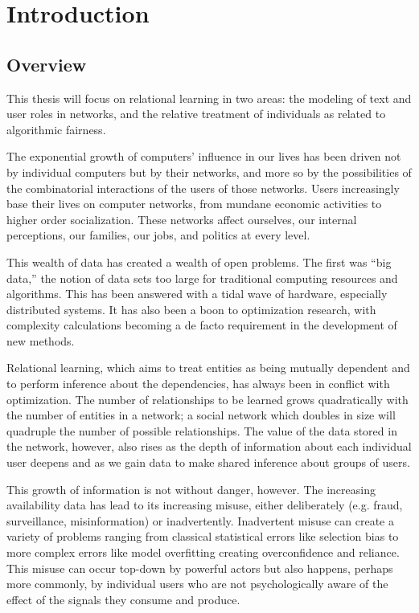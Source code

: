 \chapter{Introduction}

\section{Overview}

This thesis will focus on relational learning in two areas: the modeling of text and user roles in networks, and the relative treatment of individuals as related to algorithmic fairness.  

The exponential growth of computers' influence in our lives has been driven not by individual computers but by their networks, and more so by the possibilities of the combinatorial interactions of the users of those networks.  Users increasingly base their lives on computer networks, from mundane economic activities to higher order socialization.  These networks affect ourselves, our internal perceptions, our families, our jobs, and politics at every level.

This wealth of data has created a wealth of open problems.  The first was ``big data,'' the notion of data sets too large for traditional computing resources and algorithms.  This has been answered with a tidal wave of hardware, especially distributed systems.  It has also been a boon to optimization research, with complexity calculations becoming a de facto requirement in the development of new methods.

Relational learning, which aims to treat entities as being mutually dependent and to perform inference about the dependencies, has always been in conflict with optimization.  The number of relationships to be learned grows quadratically with the number of entities in a network; a social network which doubles in size will quadruple the number of possible relationships.  The value of the data stored in the network, however, also rises as the depth of information about each individual user deepens and as we gain data to make shared inference about groups of users.

This growth of information is not without danger, however.  The increasing availability data has lead to its increasing misuse, either deliberately (e.g. fraud, surveillance, misinformation) or inadvertently.  Inadvertent misuse can create a variety of problems ranging from classical statistical errors like selection bias to more complex errors like model overfitting creating overconfidence and reliance.  This misuse can occur top-down by powerful actors but also happens, perhaps more commonly, by individual users who are not psychologically aware of the effect of the signals they consume and produce.



